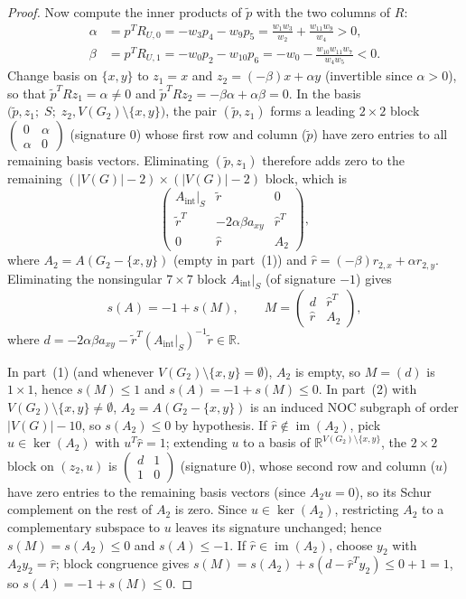\documentclass[10pt,letterpaper]{article}
\theoremstyle{zetaplain}
\theoremstyle{zetadef}
\theoremstyle{remark}
\numberwithin{equation}{section}
\DeclareMathOperator{\im}{im}
\begin{document}
\begin{proof}
Now compute the inner products of $\tilde{p}$ with the two columns of $R$:
\begin{align*}
  \alpha &= p^T R_{U,0} = -w_3 p_4 - w_9 p_5 = \frac{w_1 w_3}{w_2} + \frac{w_{11} w_9}{w_4} > 0, \\
  \beta  &= p^T R_{U,1} = -w_0 p_2 - w_{10} p_6 = -w_0 - \frac{w_{10} w_{11} w_7}{w_4 w_5} < 0.
\end{align*}
Change basis on $\{x, y\}$ to $z_1 = x$ and $z_2 = (-\beta)x + \alpha y$ (invertible since $\alpha > 0$), so that $\tilde{p}^T R z_1 = \alpha \ne 0$ and $\tilde{p}^T R z_2 = -\beta\alpha + \alpha\beta = 0$. In the basis $\bigl(\tilde{p}, z_1;\; S;\; z_2, V(G_2) \setminus \{x, y\}\bigr)$, the pair $(\tilde{p}, z_1)$ forms a leading $2 \times 2$ block $\begin{pmatrix} 0 & \alpha \\ \alpha & 0 \end{pmatrix}$ (signature $0$) whose first row and column ($\tilde{p}$) have zero entries to all remaining basis vectors. Eliminating $(\tilde{p}, z_1)$ therefore adds zero to the remaining $(|V(G)| - 2) \times (|V(G)| - 2)$ block, which is
\[
  \begin{pmatrix}
    A_{\mathrm{int}}|_S & \tilde{r} & 0 \\
    \tilde{r}^T & -2\alpha\beta a_{xy} & \hat{r}^T \\
    0 & \hat{r} & A_2
  \end{pmatrix},
\]
where $A_2 = A(G_2 - \{x, y\})$ (empty in part~(1)) and $\hat{r} = (-\beta) r_{2,x} + \alpha r_{2,y}$. Eliminating the nonsingular $7 \times 7$ block $A_{\mathrm{int}}|_S$ (of signature $-1$) gives
\[
  s(A) = -1 + s(M), \qquad M = \begin{pmatrix} d & \hat{r}^T \\ \hat{r} & A_2 \end{pmatrix},
\]
where $d = -2\alpha\beta a_{xy} - \tilde{r}^T (A_{\mathrm{int}}|_S)^{-1} \tilde{r} \in \mathbb{R}$.

In part~(1) (and whenever $V(G_2) \setminus \{x, y\} = \emptyset$), $A_2$ is empty, so $M = (d)$ is $1 \times 1$, hence $s(M) \le 1$ and $s(A) = -1 + s(M) \le 0$. In part~(2) with $V(G_2) \setminus \{x, y\} \ne \emptyset$, $A_2 = A(G_2 - \{x, y\})$ is an induced NOC subgraph of order $|V(G)| - 10$, so $s(A_2) \le 0$ by hypothesis. If $\hat{r} \notin \im(A_2)$, pick $u \in \ker(A_2)$ with $u^T \hat{r} = 1$; extending $u$ to a basis of $\mathbb{R}^{V(G_2) \setminus \{x, y\}}$, the $2 \times 2$ block on $(z_2, u)$ is $\begin{pmatrix} d & 1 \\ 1 & 0 \end{pmatrix}$ (signature $0$), whose second row and column ($u$) have zero entries to the remaining basis vectors (since $A_2 u = 0$), so its Schur complement on the rest of $A_2$ is zero. Since $u \in \ker(A_2)$, restricting $A_2$ to a complementary subspace to $u$ leaves its signature unchanged; hence $s(M) = s(A_2) \le 0$ and $s(A) \le -1$. If $\hat{r} \in \im(A_2)$, choose $y_2$ with $A_2 y_2 = \hat{r}$; block congruence gives $s(M) = s(A_2) + s(d - \hat{r}^T y_2) \le 0 + 1 = 1$, so $s(A) = -1 + s(M) \le 0$.
\end{proof}
\end{document}

